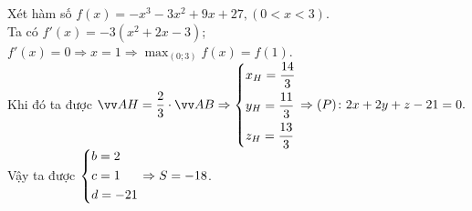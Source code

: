 \begin{ex}
{{
}	\noindent
Xét hàm số $ f(x) = - x^3 - 3x^2 + 9x + 27, (0<x<3) $.\\
Ta có $ f'(x) = -3(x^2 + 2x - 3) $; $ f'(x) = 0 \Rightarrow x = 1 \Rightarrow \displaystyle \max_{(0;3)} f(x) = f(1) $.\\
Khi đó ta được $ \overrightarrow{AH} = \dfrac{2}{3} \cdot \overrightarrow{AB}  \Rightarrow \heva{ & x_H = \dfrac{14}{3}\\ & y_H = \dfrac{11}{3} \\ & z_H = \dfrac{13}{3} } \Rightarrow (P) \colon 2x + 2y + z - 21 = 0.$\\
Vậy ta được $ \left\{\begin{aligned} & b = 2 \\ & c = 1 \\ & d = -21 \end{aligned}\right. \Rightarrow S = -18 $.
}	
\end{ex}
